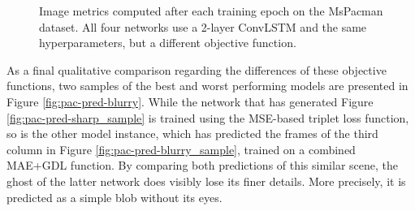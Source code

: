 \begin{figure}[htb]
\begin{subfigure}{0.5\textwidth}
{
  }
  \caption{}
  \label{fig:plot-pac-loss-ssim}
\end{subfigure}
\caption[Comparison of Image Metrics on MsPacman]{Image metrics computed after each training epoch on the MsPacman dataset. All four networks use a 2-layer ConvLSTM and the same hyperparameters, but a different objective function.} \label{fig:plot-pac-imgmetric}
\end{figure}

As a final qualitative comparison regarding the differences of these objective functions, two samples of the best and worst performing models are presented in Figure \ref{fig:pac-pred-blurry}. While the network that has generated Figure \ref{fig:pac-pred-sharp_sample} is trained using the MSE-based triplet loss function, so is the other model instance, which has predicted the frames of the third column in Figure \ref{fig:pac-pred-blurry_sample}, trained on a combined MAE+GDL function. By comparing both predictions of this similar scene, the ghost of the latter network does visibly lose its finer details. More precisely, it is predicted as a simple blob without its eyes. 

